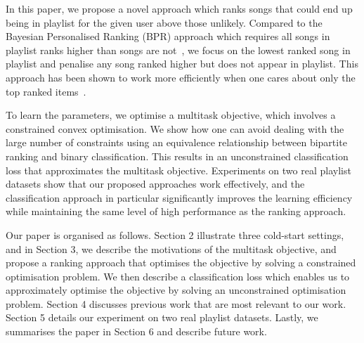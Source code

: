 In this paper, we propose a novel approach which ranks songs that could end up being in playlist for the 
given user above those unlikely.
Compared to the Bayesian Personalised Ranking (BPR) approach which requires all
songs in playlist ranks higher than songs are not~\cite{rendle2009bpr,mcfee2012million}, we focus on the lowest ranked
song in playlist and penalise any song ranked higher but does not appear in playlist.
This approach has been shown to work more efficiently when one cares about only the top ranked items~\cite{li2014top}.

To learn the parameters, we optimise a multitask objective,
which involves a constrained convex optimisation.
We show how one can avoid dealing with the large number of constraints using an equivalence relationship 
between bipartite ranking and binary classification.
This results in an unconstrained classification loss that approximates the multitask objective.
Experiments on two real playlist datasets show that our proposed approaches work effectively,
and the classification approach in particular significantly improves the learning efficiency 
while maintaining the same level of high performance as the ranking approach.

Our paper is organised as follows.
Section 2 illustrate three cold-start settings,
and in Section 3, we describe the motivations of the multitask objective, and propose a ranking approach 
that optimises the objective by solving a constrained optimisation problem.
We then describe a classification loss which enables us to approximately optimise the objective by
solving an unconstrained optimisation problem.
Section 4 discusses previous work that are most relevant to our work.
Section 5 details our experiment on two real playlist datasets.
Lastly, we summarises the paper in Section 6 and describe future work.
